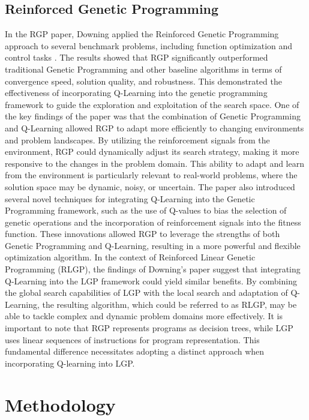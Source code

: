 \documentclass[12pt]{report}
\begin{document}
\section{Reinforced Genetic Programming}
In the RGP paper, Downing applied the Reinforced Genetic Programming approach to several benchmark problems, including function optimization and control tasks \cite{downing1995reinforced}. The results showed that RGP significantly outperformed traditional Genetic Programming and other baseline algorithms in terms of convergence speed, solution quality, and robustness. This demonstrated the effectiveness of incorporating Q-Learning into the genetic programming framework to guide the exploration and exploitation of the search space.
One of the key findings of the paper was that the combination of Genetic Programming and Q-Learning allowed RGP to adapt more efficiently to changing environments and problem landscapes. By utilizing the reinforcement signals from the environment, RGP could dynamically adjust its search strategy, making it more responsive to the changes in the problem domain. This ability to adapt and learn from the environment is particularly relevant to real-world problems, where the solution space may be dynamic, noisy, or uncertain.
The paper also introduced several novel techniques for integrating Q-Learning into the Genetic Programming framework, such as the use of Q-values to bias the selection of genetic operations and the incorporation of reinforcement signals into the fitness function. These innovations allowed RGP to leverage the strengths of both Genetic Programming and Q-Learning, resulting in a more powerful and flexible optimization algorithm.
In the context of Reinforced Linear Genetic Programming (RLGP), the findings of Downing's paper suggest that integrating Q-Learning into the LGP framework could yield similar benefits. By combining the global search capabilities of LGP with the local search and adaptation of Q-Learning, the resulting algorithm, which could be referred to as RLGP, may be able to tackle complex and dynamic problem domains more effectively.
It is important to note that RGP represents programs as decision trees, while LGP uses linear sequences of instructions for program representation. This fundamental difference necessitates adopting a distinct approach when incorporating Q-learning into LGP.
\chapter{Methodology}
\end{document}

